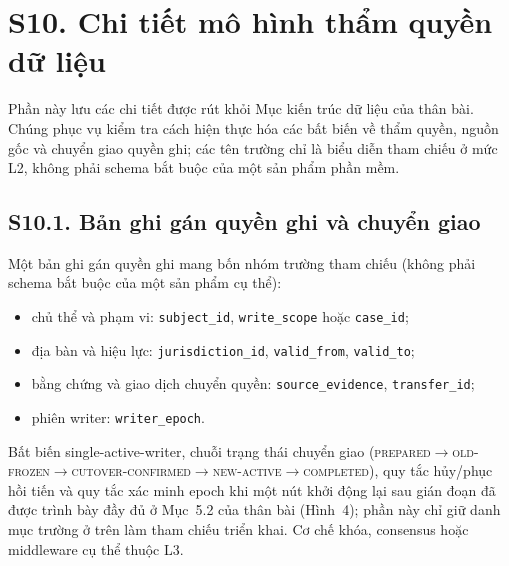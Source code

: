 \documentclass[a4paper,11pt]{article}
\begin{document}
\section*{S10. Chi tiết mô hình thẩm quyền dữ liệu}
Phần này lưu các chi tiết được rút khỏi Mục kiến trúc dữ liệu của thân bài. Chúng phục vụ kiểm tra cách hiện thực hóa các bất biến về thẩm quyền, nguồn gốc và chuyển giao quyền ghi; các tên trường chỉ là biểu diễn tham chiếu ở mức L2, không phải schema bắt buộc của một sản phẩm phần mềm.

\subsection*{S10.1. Bản ghi gán quyền ghi và chuyển giao}
Một bản ghi gán quyền ghi mang bốn nhóm trường tham chiếu (không phải schema bắt buộc của một sản phẩm cụ thể):
\begin{itemize}
\item chủ thể và phạm vi: \texttt{subject\_id}, \texttt{write\_scope} hoặc \texttt{case\_id};
\item địa bàn và hiệu lực: \texttt{jurisdiction\_id}, \texttt{valid\_from}, \texttt{valid\_to};
\item bằng chứng và giao dịch chuyển quyền: \texttt{source\_evidence}, \texttt{transfer\_id};
\item phiên writer: \texttt{writer\_epoch}.
\end{itemize}
Bất biến single-active-writer, chuỗi trạng thái chuyển giao (\textsc{prepared}$\rightarrow$\textsc{old-frozen}$\rightarrow$\textsc{cutover-confirmed}$\rightarrow$\textsc{new-active}$\rightarrow$\textsc{completed}), quy tắc hủy/phục hồi tiến và quy tắc xác minh epoch khi một nút khởi động lại sau gián đoạn đã được trình bày đầy đủ ở Mục~5.2 của thân bài (Hình~4); phần này chỉ giữ danh mục trường ở trên làm tham chiếu triển khai. Cơ chế khóa, consensus hoặc middleware cụ thể thuộc L3.
\end{document}
